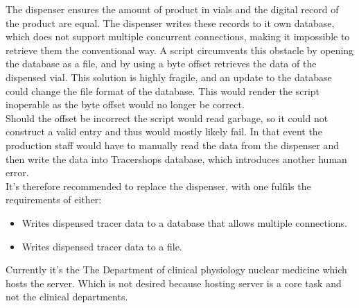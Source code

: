 \documentclass{article}
\begin{document}
The dispenser ensures the amount of product in vials and the digital record of the product are equal.
The dispenser writes these records to it own database, which does not support multiple concurrent connections, making it impossible to retrieve them the conventional way.
A script circumvents this obstacle by opening the database as a file, and by using a byte offset retrieves the data of the dispensed vial.
This solution is highly fragile, and an update to the database could change the file format of the database.
This would render the script inoperable as the byte offset would no longer be correct.\\
Should the offset be incorrect the script would read garbage, so it could not construct a valid entry and thus would mostly likely fail.
In that event the production staff would have to manually read the data from the dispenser and then write the data into Tracershops database, which introduces another human error.\\
It's therefore recommended to replace the dispenser, with one fulfils the requirements of either:
\begin{itemize}
  \item Writes dispensed tracer data to a database that allows multiple connections.
  \item Writes dispensed tracer data to a file.
\end{itemize}
Currently it's the The Department of clinical physiology nuclear medicine which hosts the server.
Which is not desired because hosting server is a core task  and not the clinical departments.
\end{document}
